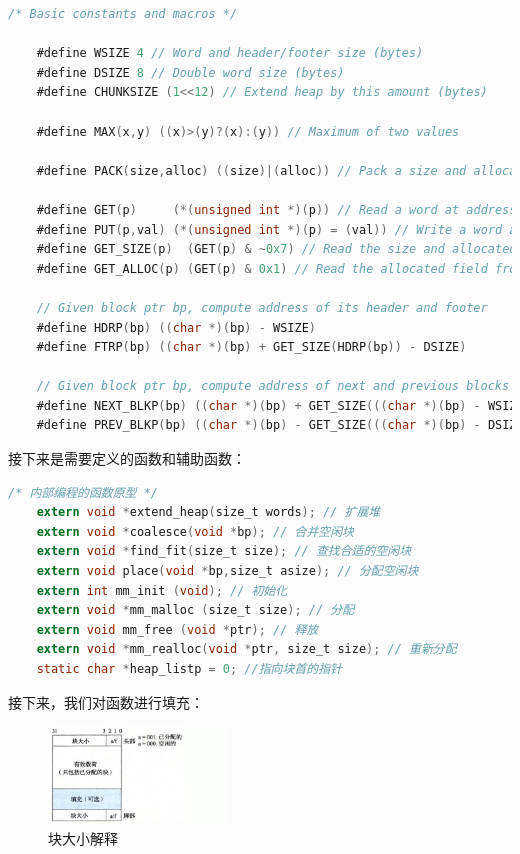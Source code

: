 \begin{lstlisting}[language = C , title = { Define List } ]
    /* Basic constants and macros */

    #define WSIZE 4 // Word and header/footer size (bytes)
    #define DSIZE 8 // Double word size (bytes)
    #define CHUNKSIZE (1<<12) // Extend heap by this amount (bytes)

    #define MAX(x,y) ((x)>(y)?(x):(y)) // Maximum of two values

    #define PACK(size,alloc) ((size)|(alloc)) // Pack a size and allocated bit into a word

    #define GET(p)     (*(unsigned int *)(p)) // Read a word at address p
    #define PUT(p,val) (*(unsigned int *)(p) = (val)) // Write a word at address p
    #define GET_SIZE(p)  (GET(p) & ~0x7) // Read the size and allocated fields from address p
    #define GET_ALLOC(p) (GET(p) & 0x1) // Read the allocated field from address p

    // Given block ptr bp, compute address of its header and footer
    #define HDRP(bp) ((char *)(bp) - WSIZE)
    #define FTRP(bp) ((char *)(bp) + GET_SIZE(HDRP(bp)) - DSIZE)

    // Given block ptr bp, compute address of next and previous blocks
    #define NEXT_BLKP(bp) ((char *)(bp) + GET_SIZE(((char *)(bp) - WSIZE)))
    #define PREV_BLKP(bp) ((char *)(bp) - GET_SIZE(((char *)(bp) - DSIZE)))

\end{lstlisting}

接下来是需要定义的函数和辅助函数：

\begin{lstlisting}[language = C , title = { Function List } ]
    /* 内部编程的函数原型 */
    extern void *extend_heap(size_t words); // 扩展堆
    extern void *coalesce(void *bp); // 合并空闲块
    extern void *find_fit(size_t size); // 查找合适的空闲块
    extern void place(void *bp,size_t asize); // 分配空闲块
    extern int mm_init (void); // 初始化
    extern void *mm_malloc (size_t size); // 分配
    extern void mm_free (void *ptr); // 释放
    extern void *mm_realloc(void *ptr, size_t size); // 重新分配
    static char *heap_listp = 0; //指向块首的指针
\end{lstlisting}

接下来，我们对函数进行填充：

\begin{figure} [H]
    \centering
    \includegraphics[width=0.42\textwidth]{BlockSize.png}
    \caption{块大小解释}
\end{figure}

